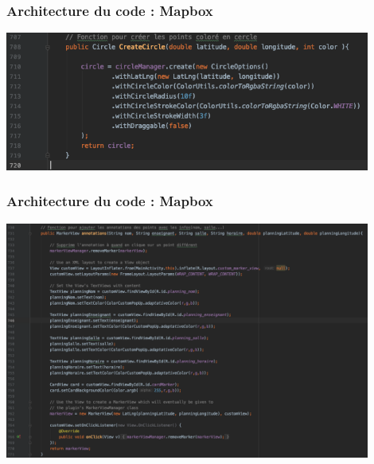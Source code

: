 \documentclass{beamer}
\begin{document}
  \begin{frame}
    \frametitle{Architecture du code : Mapbox}

    \begin{center}
      \includegraphics[width=120mm, scale=0.5]{circle.png}
    \end{center}

  \end{frame}

  \begin{frame}
    \frametitle{Architecture du code : Mapbox}

    \begin{center}
      \includegraphics[width=120mm, scale=0.5]{markerView.png}
    \end{center}

  \end{frame}

  
\end{document}
